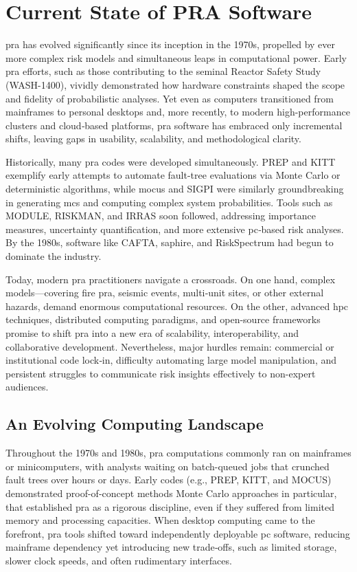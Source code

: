 \chapter{Current State of PRA Software}
\acrfull{pra} has evolved significantly since its inception in the 1970s, propelled by ever more complex risk models and simultaneous leaps in computational power. Early \acrshort{pra} efforts, such as those contributing to the seminal Reactor Safety Study (WASH-1400), vividly demonstrated how hardware constraints shaped the scope and fidelity of probabilistic analyses. Yet even as computers transitioned from mainframes to personal desktops and, more recently, to modern high-performance clusters and cloud‐based platforms, \acrshort{pra} software has embraced only incremental shifts, leaving gaps in usability, scalability, and methodological clarity.

Historically, many \acrshort{pra} codes were developed simultaneously. PREP and KITT exemplify early attempts to automate fault-tree evaluations via Monte Carlo or deterministic algorithms, while \acrshort{mocus} and SIGPI were similarly groundbreaking in generating \acrfull{mcs} and computing complex system probabilities. Tools such as MODULE, RISKMAN, and IRRAS soon followed, addressing importance measures, uncertainty quantification, and more extensive \acrfull{pc}‐based risk analyses. By the 1980s, software like CAFTA, \acrshort{saphire}, and RiskSpectrum had begun to dominate the industry.



Today, modern \acrshort{pra} practitioners navigate a crossroads. On one hand, complex models—covering fire \acrshort{pra}, seismic events, multi‐unit sites, or other external hazards, demand enormous computational resources. On the other, advanced \acrfull{hpc} techniques, distributed computing paradigms, and open-source frameworks promise to shift \acrshort{pra} into a new era of scalability, interoperability, and collaborative development. Nevertheless, major hurdles remain: commercial or institutional code lock‐in, difficulty automating large model manipulation, and persistent struggles to communicate risk insights effectively to non-expert audiences.

\section{An Evolving Computing Landscape}

Throughout the 1970s and 1980s, \acrshort{pra} computations commonly ran on mainframes or minicomputers, with analysts waiting on batch-queued jobs that crunched fault trees over hours or days. Early codes (e.g., PREP, KITT, and MOCUS) demonstrated proof-of-concept methods Monte Carlo approaches in particular, that established \acrshort{pra} as a rigorous discipline, even if they suffered from limited memory and processing capacities. When desktop computing came to the forefront, \acrshort{pra} tools shifted toward independently deployable \acrshort{pc} software, reducing mainframe dependency yet introducing new trade‐offs, such as limited storage, slower clock speeds, and often rudimentary interfaces.

